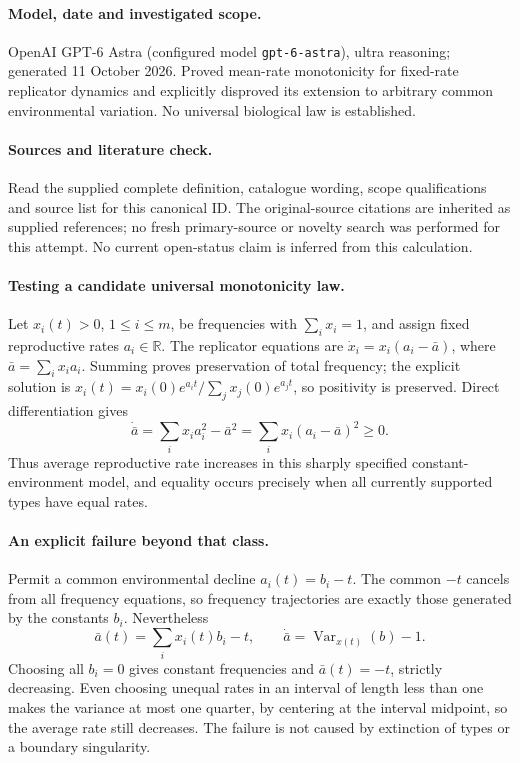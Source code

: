 \documentclass[11pt]{article}
\begin{document}
\paragraph{Model, date and investigated scope.}
OpenAI GPT-6 Astra (configured model \texttt{gpt-6-astra}), ultra reasoning; generated 11 October 2026. Proved mean-rate monotonicity for fixed-rate replicator dynamics and explicitly disproved its extension to arbitrary common environmental variation. No universal biological law is established.

\paragraph{Sources and literature check.}
Read the supplied complete definition, catalogue wording, scope qualifications and source list for this canonical ID. The original-source citations are inherited as supplied references; no fresh primary-source or novelty search was performed for this attempt. No current open-status claim is inferred from this calculation.

\paragraph{Testing a candidate universal monotonicity law.}Let \(x_i(t)>0\), \(1\le i\le m\), be frequencies with \(\sum_i x_i=1\), and assign fixed reproductive rates \(a_i\in\mathbb R\). The replicator equations are \(\dot x_i=x_i(a_i-\bar a)\), where \(\bar a=\sum_i x_i a_i\). Summing proves preservation of total frequency; the explicit solution is \(x_i(t)=x_i(0)e^{a_it}/\sum_jx_j(0)e^{a_jt}\), so positivity is preserved. Direct differentiation gives
\[\dot{\bar a}=\sum_i x_i a_i^2-\bar a^2=\sum_i x_i(a_i-\bar a)^2\ge0.\]
Thus average reproductive rate increases in this sharply specified constant-environment model, and equality occurs precisely when all currently supported types have equal rates.
\paragraph{An explicit failure beyond that class.}Permit a common environmental decline \(a_i(t)=b_i-t\). The common \(-t\) cancels from all frequency equations, so frequency trajectories are exactly those generated by the constants \(b_i\). Nevertheless
\[\bar a(t)=\sum_i x_i(t)b_i-t,\qquad \dot{\bar a}=\operatorname{Var}_{x(t)}(b)-1.\]
Choosing all \(b_i=0\) gives constant frequencies and \(\bar a(t)=-t\), strictly decreasing. Even choosing unequal rates in an interval of length less than one makes the variance at most one quarter, by centering at the interval midpoint, so the average rate still decreases. The failure is not caused by extinction of types or a boundary singularity.
\end{document}
